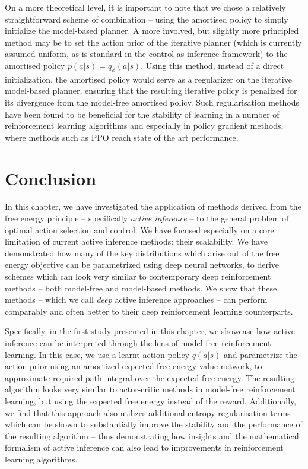 On a more theoretical level, it is important to note that we chose a relatively straightforward scheme of combination -- using the amortised policy to simply initialize the model-based planner. A more involved, but slightly more principled method may be to set the action prior of the iterative planner (which is currently assumed uniform, as is standard in the control as inference framework) to the amortised policy $p(a | s) = q_\phi(a | s)$. Using this method, instead of a direct initialization, the amortised policy would serve as a regularizer on the iterative model-based planner, ensuring that the resulting iterative policy is penalized for its divergence from the model-free amortised policy. Such regularisation methods have been found to be beneficial for the stability of learning in a number of reinforcement learning algorithms and especially in policy gradient methods, where methods such as PPO \citep{schulman2017proximal} reach state of the art performance.

\section{Conclusion}

In this chapter, we have investigated the application of methods derived from the free energy principle -- specifically \emph{active inference} -- to the general problem of optimal action selection and control. We have focused especially on a core limitation of current active inference methods: their scalability. We have demonstrated how many of the key distributions which arise out of the free energy objective can be parametrized using deep neural networks, to derive schemes which can look very similar to contemporary deep reinforcement methods -- both model-free and model-based methods. We show that these methods -- which we call \emph{deep} active inference approaches -- can perform comparably and often better to their deep reinforcement learning counterparts. 

Specifically, in the first study presented in this chapter, we showcase how active inference can be interpreted through the lens of model-free reinforcement learning. In this case, we use a learnt action policy $q(a | s)$ and parametrize the action prior using an amortized expected-free-energy value network, to approximate required path integral over the expected free energy. The resulting algorithm looks very similar to actor-critic methods in model-free reinforcement learning, but using the expected free energy instead of the reward. Additionally, we find that this approach also utilizes additional entropy regularisation terms which can be shown to substantially improve the stability and the performance of the resulting algorithm -- thus demonstrating how insights and the mathematical formalism of active inference can also lead to improvements in reinforcement learning algorithms.

